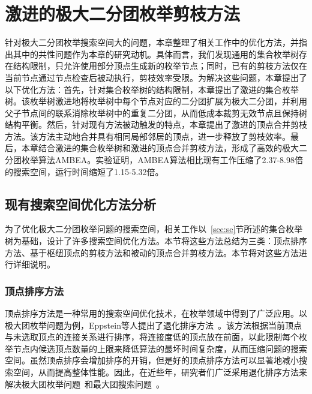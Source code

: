 \chapter{激进的极大二分团枚举剪枝方法}
\label{ch:aggressive_mbe}

针对极大二分团枚举搜索空间大的问题，本章整理了相关工作中的优化方法，并指出其中的共性问题作为本章的研究动机。具体而言，我们发现通用的集合枚举树存在结构限制，只允许使用部分顶点生成新的枚举节点；同时，已有的剪枝方法仅在当前节点通过节点检查后被动执行，剪枝效率受限。为解决这些问题，本章提出了以下优化方法：首先，针对集合枚举树的结构限制，本章提出了激进的集合枚举树。该枚举树激进地将枚举树中每个节点对应的二分团扩展为极大二分团，并利用父子节点间的联系消除枚举树中的重复二分团，从而低成本裁剪无效节点且保持树结构平衡。然后，针对现有方法被动触发的特点，本章提出了激进的顶点合并剪枝方法。该方法主动地合并具有相同局部邻居的顶点，进一步释放了剪枝效率。最后，本章结合激进的集合枚举树和激进的顶点合并剪枝方法，形成了高效的极大二分团枚举算法AMBEA。实验证明，AMBEA算法相比现有工作压缩了2.37-8.98倍的搜索空间，运行时间缩短了1.15-5.32倍。

\section{现有搜索空间优化方法分析}
\label{sec:opt}

为了优化极大二分团枚举问题的搜索空间，相关工作以~\ref{sec:se}节所述的集合枚举树为基础，设计了许多搜索空间优化方法。本节将这些方法总结为三类：顶点排序方法、基于枢纽顶点的剪枝方法和被动的顶点合并剪枝方法。本节将对这些方法进行详细说明。

\subsection{顶点排序方法}
\label{subsec:order}

顶点排序方法是一种常用的搜索空间优化技术，在枚举领域中得到了广泛应用。以极大团枚举问题为例，Eppstein等人提出了退化排序方法~\cite{MCEdegeneracy10}。该方法根据当前顶点与未选取顶点的连接关系进行排序，将连接度低的顶点放在前面，以此限制每个枚举节点内候选顶点数量的上限来降低算法的最坏时间复杂度，从而压缩问题的搜索空间。虽然顶点排序会增加排序的开销，但是好的顶点排序方法可以显著地减小搜索空间，从而提高整体性能。因此，在近些年，研究者们广泛采用退化排序方法来解决极大团枚举问题~\cite{MCEparallel20,MCE20,MCE22,MCE-GPU21,MCE-22}和最大团搜索问题~\cite{MEC20,MEC22}。



